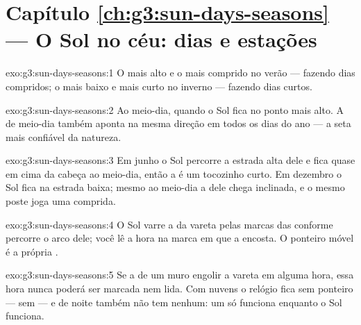 \section*{Capítulo \ref{ch:g3:sun-days-seasons} --- O Sol no céu: dias e estações}

\begin{solution}{exo:g3:sun-days-seasons:1}
O mais alto e o mais comprido no verão --- fazendo dias compridos; o
mais baixo e mais curto no inverno --- fazendo dias curtos.
\end{solution}

\begin{solution}{exo:g3:sun-days-seasons:2}
Ao meio-dia, quando o Sol fica no ponto mais alto. A  de
meio-dia também aponta na mesma direção em todos os dias do ano --- a
seta mais confiável da natureza.
\end{solution}

\begin{solution}{exo:g3:sun-days-seasons:3}
Em junho o Sol percorre a estrada alta dele e fica quase em cima da
cabeça ao meio-dia, então a  é um tocozinho curto. Em dezembro
o Sol fica na estrada baixa; mesmo ao meio-dia a  dele chega
inclinada, e o mesmo poste joga uma  comprida.
\end{solution}

\begin{solution}{exo:g3:sun-days-seasons:4}
O Sol varre a  da vareta pelas marcas das  conforme
percorre o arco dele; você lê a hora na marca em que a 
encosta. O ponteiro móvel é a própria .
\end{solution}

\begin{solution}{exo:g3:sun-days-seasons:5}
Se a  de um muro engolir a vareta em alguma hora, essa hora
nunca poderá ser marcada nem lida. Com nuvens o relógio fica sem
ponteiro --- sem  --- e de noite também não tem nenhum: um
 só funciona enquanto o Sol funciona.
\end{solution}

